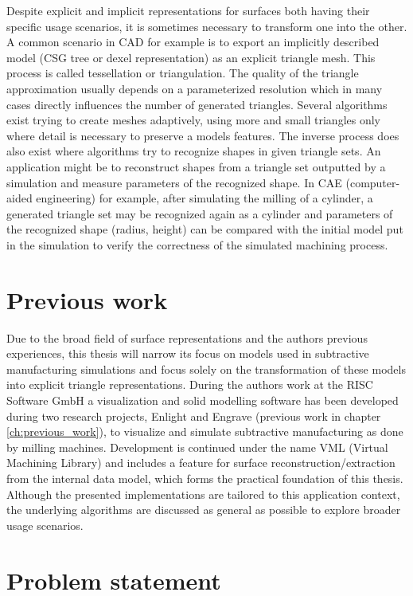 Despite explicit and implicit representations for surfaces both having their specific usage scenarios, it is sometimes necessary to transform one into the other.
A common scenario in CAD for example is to export an implicitly described model (\eg CSG tree or dexel representation) as an explicit triangle mesh.
This process is called tessellation or triangulation.
The quality of the triangle approximation usually depends on a parameterized resolution which in many cases directly influences the number of generated triangles.
Several algorithms exist trying to create meshes adaptively, using more and small triangles only where detail is necessary to preserve a models features.
%
The inverse process does also exist where algorithms try to recognize shapes in given triangle sets.
An application might be to reconstruct shapes from a triangle set outputted by a simulation and measure parameters of the recognized shape.
In CAE (computer-aided engineering) for example, after simulating the milling of a cylinder, a generated triangle set may be recognized again as a cylinder and parameters of the recognized shape (\eg radius, height) can be compared with the initial model put in the simulation to verify the correctness of the simulated machining process.


\section{Previous work}

Due to the broad field of surface representations and the authors previous experiences, this thesis will narrow its focus on models used in subtractive manufacturing simulations and focus solely on the transformation of these models into explicit triangle representations.
During the authors work at the RISC Software GmbH a visualization and solid modelling software has been developed during two research projects, Enlight and Engrave (\cf previous work in chapter \ref{ch:previous_work}), to visualize and simulate subtractive manufacturing as done by milling machines.
Development is continued under the name VML (Virtual Machining Library) and includes a feature for surface reconstruction/extraction from the internal data model, which forms the practical foundation of this thesis.
Although the presented implementations are tailored to this application context, the underlying algorithms are discussed as general as possible to explore broader usage scenarios.


\section{Problem statement}
\label{sec:problem}

